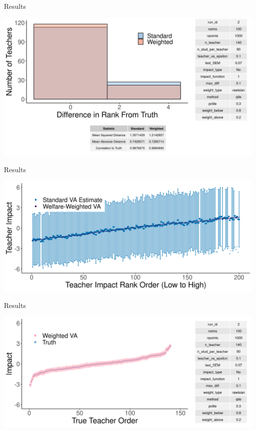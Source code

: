 \documentclass[11pt]{beamer}
\begin{document}

\begin{frame}{Results}

\includegraphics[width=\linewidth]{slides/Figures/hist_run_2.png}

\end{frame}



\begin{frame}{Results}

\includegraphics[width=\linewidth]{slides/Figures/standard_cat_run_2.png}

\end{frame}



\begin{frame}{Results}

\includegraphics[width=\linewidth]{slides/Figures/ww_cat_run_2.png}

\end{frame}
\end{document}
